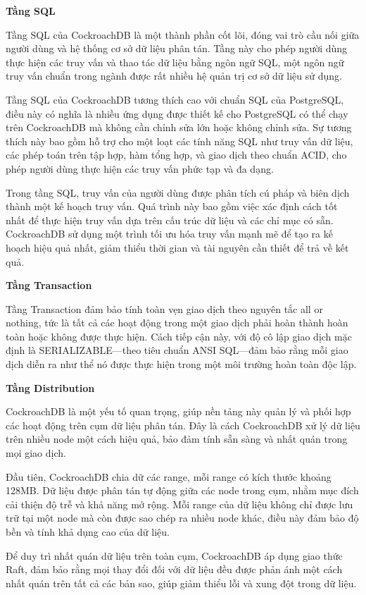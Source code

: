 \documentclass[14pt]{article}
\begin{document}
\textbf{Tầng SQL}

Tầng SQL của CockroachDB là một thành phần cốt lõi, đóng vai trò cầu nối giữa người dùng và hệ thống cơ sở dữ liệu phân tán. Tầng này cho phép người dùng thực hiện các truy vấn và thao tác dữ liệu bằng ngôn ngữ SQL, một ngôn ngữ truy vấn chuẩn trong ngành được rất nhiều hệ quản trị cơ sở dữ liệu sử dụng.

Tầng SQL của CockroachDB tương thích cao với chuẩn SQL của PostgreSQL, điều này có nghĩa là nhiều ứng dụng được thiết kế cho PostgreSQL có thể chạy trên CockroachDB mà không cần chỉnh sửa lớn hoặc không chỉnh sửa. Sự tương thích này bao gồm hỗ trợ cho một loạt các tính năng SQL như truy vấn dữ liệu, các phép toán trên tập hợp, hàm tổng hợp, và giao dịch theo chuẩn ACID, cho phép người dùng thực hiện các truy vấn phức tạp và đa dạng.

Trong tầng SQL, truy vấn của người dùng được phân tích cú pháp và biên dịch thành một kế hoạch truy vấn. Quá trình này bao gồm việc xác định cách tốt nhất để thực hiện truy vấn dựa trên cấu trúc dữ liệu và các chỉ mục có sẵn. CockroachDB sử dụng một trình tối ưu hóa truy vấn mạnh mẽ để tạo ra kế hoạch hiệu quả nhất, giảm thiểu thời gian và tài nguyên cần thiết để trả về kết quả.


\textbf{Tầng Transaction}

Tầng Transaction đảm bảo tính toàn vẹn giao dịch theo nguyên tắc all or nothing, tức là tất cả các hoạt động trong một giao dịch phải hoàn thành hoàn toàn hoặc không được thực hiện. Cách tiếp cận này, với độ cô lập giao dịch mặc định là SERIALIZABLE—theo tiêu chuẩn ANSI SQL—đảm bảo rằng mỗi giao dịch diễn ra như thể nó được thực hiện trong một môi trường hoàn toàn độc lập.

\textbf{Tầng Distribution}

CockroachDB là một yếu tố quan trọng, giúp nền tảng này quản lý và phối hợp các hoạt động trên cụm dữ liệu phân tán. Đây là cách CockroachDB xử lý dữ liệu trên nhiều node một cách hiệu quả, bảo đảm tính sẵn sàng và nhất quán trong mọi giao dịch.

Đầu tiên, CockroachDB chia dữ các range, mỗi range có kích thước khoảng 128MB. Dữ liệu được phân tán tự động giữa các node trong cụm, nhằm mục đích cải thiện độ trễ và khả năng mở rộng. Mỗi range của dữ liệu không chỉ được lưu trữ tại một node mà còn được sao chép ra nhiều node khác, điều này đảm bảo độ bền và tính khả dụng cao của dữ liệu.

Để duy trì nhất quán dữ liệu trên toàn cụm, CockroachDB áp dụng giao thức Raft, đảm bảo rằng mọi thay đổi đối với dữ liệu đều được phản ánh một cách nhất quán trên tất cả các bản sao, giúp giảm thiểu lỗi và xung đột trong dữ liệu.
\end{document}
